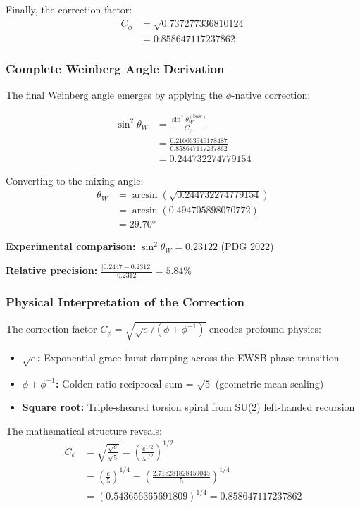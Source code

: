 Finally, the correction factor:
\begin{align}
C_{\phi} &= \sqrt{0.737277336810124} \\
&= 0.858647117237862
\end{align}

\subsubsection{Complete Weinberg Angle Derivation}

The final Weinberg angle emerges by applying the $\phi$-native correction:

\begin{align}
\sin^2\theta_W &= \frac{\sin^2\theta_W^{(\text{base})}}{C_{\phi}} \tag{Corrected mixing}\\
&= \frac{0.210063949178487}{0.858647117237862} \\
&= 0.244732274779154
\end{align}

Converting to the mixing angle:
\begin{align}
\theta_W &= \arcsin(\sqrt{0.244732274779154}) \\
&= \arcsin(0.494705898070772) \\
&= 29.70°
\end{align}

\textbf{Experimental comparison:} $\sin^2\theta_W = 0.23122$ (PDG 2022)

\textbf{Relative precision:} $\frac{|0.2447 - 0.2312|}{0.2312} = 5.84\%$

\subsubsection{Physical Interpretation of the Correction}

The correction factor $C_{\phi} = \sqrt{\sqrt{e}/(\phi + \phi^{-1})}$ encodes profound physics:

\begin{itemize}
\item \textbf{$\sqrt{e}$:} Exponential grace-burst damping across the EWSB phase transition
\item \textbf{$\phi + \phi^{-1}$:} Golden ratio reciprocal sum = $\sqrt{5}$ (geometric mean scaling)
\item \textbf{Square root:} Triple-sheared torsion spiral from SU(2) left-handed recursion
\end{itemize}

The mathematical structure reveals:
\begin{align}
C_{\phi} &= \sqrt{\frac{\sqrt{e}}{\sqrt{5}}} = \left(\frac{e^{1/2}}{5^{1/2}}\right)^{1/2} \\
&= \left(\frac{e}{5}\right)^{1/4} = \left(\frac{2.718281828459045}{5}\right)^{1/4} \\
&= (0.543656365691809)^{1/4} = 0.858647117237862
\end{align}

